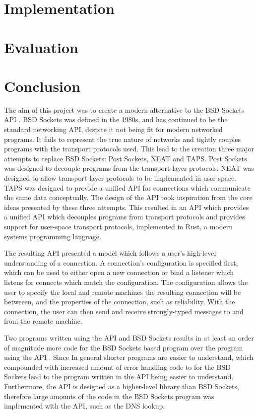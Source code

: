 \documentclass{l4proj}
\begin{document}
\chapter{Implementation}\label{ch:implementation}


\chapter{Evaluation}\label{ch:evaluation}


\chapter{Conclusion}\label{ch:conclusion}
The aim of this project was to create a modern alternative to the BSD Sockets API .
BSD Sockets was defined in the 1980s, and has continued to be the standard networking API, despite it not being fit for
modern networked programs.
It fails to represent the true nature of networks and tightly couples programs with the transport protocols used.
This lead to the creation three major attempts to replace BSD Sockets: Post Sockets, NEAT and TAPS.
Post Sockets was designed to decouple programs from the transport-layer protocols.
NEAT was designed to allow transport-layer protocols to be implemented in user-space.
TAPS was designed to provide a unified API for connections which communicate the same data conceptually.
The design of the API took inspiration from the core ideas presented by these three attempts.
This resulted in an API which provides a unified API which decouples programs from transport protocols and provides
support for user-space transport protocols, implemented in Rust, a modern systems programming language.

The resulting API presented a model which follows a user's high-level understanding of a connection.
A connection's configuration is specified first, which can be used to either open a new connection or bind a listener
which listens for connects which match the configuration.
The configuration allows the user to specify the local and remote machines the resulting connection will be betweeen,
and the properties of the connection, such as reliability.
With the connection, the user can then send and receive strongly-typed messages to and from the remote machine.

Two programs written using the API and BSD Sockets results in at least an order of magnitude more code for the BSD
Sockets based program over the program using the API .
Since In general shorter programs are easier to understand, which compounded with increased amount of error handling
code to for the BSD Sockets lead to the program written in the API being easier to understand.
Furthermore, the API is designed as a higher-level library than BSD Sockets, therefore large amounts of the code in the
BSD Sockets program was implemented with the API, such as the DNS lookup.
\end{document}
